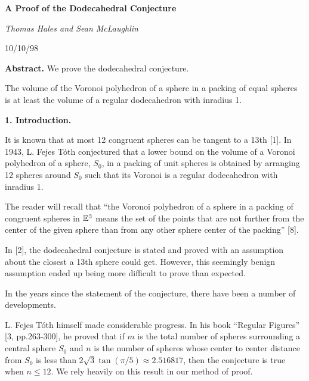 \def\today{\ifcase\month\or
    January\or February\or March\or April\or May\or June\or
    July\or August\or September\or October\or November\or December\fi
    \space\number\day, \number\year}






\centerline{\bf{A Proof of the Dodecahedral Conjecture}}
\vskip 6pt
\centerline{\sl Thomas Hales and Sean McLaughlin}
\bigskip
\centerline{10/10/98}
\bigskip

{\bf Abstract.}  We prove the dodecahedral conjecture.

\bigskip

 The volume of the Voronoi polyhedron of a sphere in a packing 
of equal spheres is at least the volume of a regular dodecahedron with inradius 1.
 \endproclaim

\bigskip

\centerline {{ \bf 1. Introduction.}}

\bigskip



It is known that at most 12 congruent spheres can be tangent to a 13th [1]. 
In 1943, L. Fejes T\'oth conjectured that a lower bound on the volume of a 
Voronoi polyhedron of a sphere, $S_0$, in a packing of unit spheres is obtained
 by arranging 12 spheres around $S_0$ such that its Voronoi is a 
regular dodecahedron with inradius 1. 

The reader will recall that ``the Voronoi polyhedron of a sphere in a packing of congruent
 spheres in $\Bbb E^3$ means the set of the points that are not further from the center of 
the given sphere than from any other sphere center of the packing'' [8].

In [2], the dodecahedral conjecture is stated and proved with an assumption 
about the closest
 a 13th sphere could get.  However, this seemingly benign assumption ended up being
 more difficult to prove than expected. 

In the years since the statement of the conjecture, there have been a number of 
developments.  

L. Fejes T\'oth himself made considerable progress.  In his book ``Regular Figures'' 
[3, pp.263-300], he proved that if $m$ is the total number of spheres surrounding 
a central sphere $S_0$ and $n$ is the number of spheres whose center to center 
distance from $S_0$ is less than  $2 \sqrt 3 \tan(\pi/5)\approx 2.516817$, then 
the conjecture is true when $n\leq 12$.  We rely heavily 
on this result in our method of proof.

